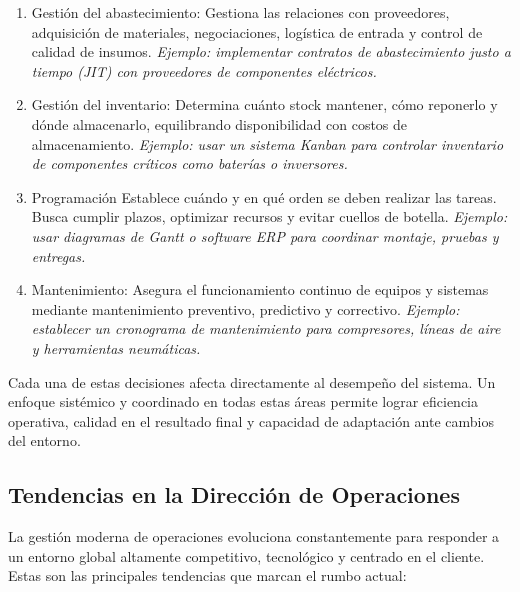 \documentclass[a4paper,oneside,11pt]{article}
\begin{document}
\begin{enumerate}
    \item Gestión del abastecimiento: Gestiona las relaciones con proveedores, adquisición de materiales, negociaciones, logística de entrada y control de calidad de insumos. \textit{Ejemplo: implementar contratos de abastecimiento justo a tiempo (JIT) con proveedores de componentes eléctricos.}
    \item Gestión del inventario: Determina cuánto stock mantener, cómo reponerlo y dónde almacenarlo, equilibrando disponibilidad con costos de almacenamiento. \textit{Ejemplo: usar un sistema Kanban para controlar inventario de componentes críticos como baterías o inversores.}
    \item Programación Establece cuándo y en qué orden se deben realizar las tareas. Busca cumplir plazos, optimizar recursos y evitar cuellos de botella. \textit{Ejemplo: usar diagramas de Gantt o software ERP para coordinar montaje, pruebas y entregas.}
    \item Mantenimiento: Asegura el funcionamiento continuo de equipos y sistemas mediante mantenimiento preventivo, predictivo y correctivo. \textit{Ejemplo: establecer un cronograma de mantenimiento para compresores, líneas de aire y herramientas neumáticas.}
\end{enumerate}

Cada una de estas decisiones afecta directamente al desempeño del sistema. Un enfoque sistémico y coordinado en todas estas áreas permite lograr eficiencia operativa, calidad en el resultado final y capacidad de adaptación ante cambios del entorno.

\subsection{Tendencias en la Dirección de Operaciones}

La gestión moderna de operaciones evoluciona constantemente para responder a un entorno global altamente competitivo, tecnológico y centrado en el cliente. Estas son las principales tendencias que marcan el rumbo actual:
\end{document}
